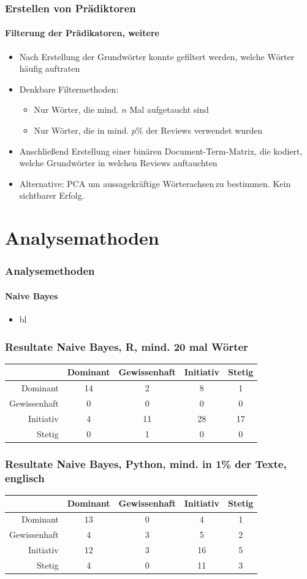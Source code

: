 \documentclass{beamer}
\begin{document}
\begin{frame}
\frametitle{Erstellen von Prädiktoren}
\framesubtitle{Filterung der Prädikatoren, weitere}
\begin{itemize}\itemsep12pt
\item Nach Erstellung der Grundwörter konnte gefiltert werden, welche Wörter häufig auftraten
\item Denkbare Filtermethoden:
\begin{itemize}
\item Nur Wörter, die mind. $n$ Mal aufgetaucht sind 
\item Nur Wörter, die in mind. $p\%$ der Reviews verwendet wurden
\end{itemize} 
\item Anschließend Erstellung einer binären Document-Term-Matrix, die kodiert, welche Grundwörter in welchen Reviews auftauchten
\item Alternative: PCA um aussagekräftige \glqq Wörterachsen\grqq \,zu bestimmen. Kein sichtbarer Erfolg.
\end{itemize}
\end{frame}


\section{Analysemathoden}
\begin{frame}
\frametitle{Analysemethoden}
\framesubtitle{Naive Bayes}
\begin{itemize}\itemsep12pt
\item bl
\end{itemize}
\end{frame}

\begin{frame}
\frametitle{Resultate Naive Bayes, R, mind. 20 mal Wörter}
\begin{tabular}{r|c|c|c|c|}
 &  Dominant  & Gewissenhaft & Initiativ & Stetig\\
\hline
Dominant & 14 & 2 & 8 & 1 \\
Gewissenhaft & 0 & 0 & 0 & 0\\
Initiativ & 4 & 11 & 28 & 17\\
Stetig & 0 & 1 & 0 & 0
\end{tabular}
\end{frame}


\begin{frame}
\frametitle{Resultate Naive Bayes, Python, mind. in 1\% der Texte, englisch}
\begin{tabular}{r|c|c|c|c|}
 &  Dominant  & Gewissenhaft & Initiativ & Stetig\\
\hline
Dominant & 13 & 0 & 4 & 1 \\
Gewissenhaft & 4 & 3 & 5 & 2\\
Initiativ & 12 & 3 & 16 & 5\\
Stetig & 4 & 0 & 11 & 3
\end{tabular}
\end{frame}
\end{document}
